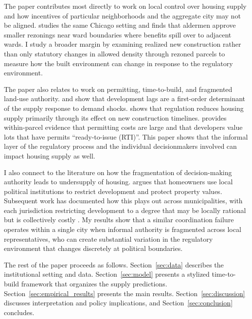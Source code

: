 The paper contributes most directly to work on local control over housing supply and how incentives of particular neighborhoods and the aggregate city may not be aligned. 
\citet{khan_decentralized_2021} studies the same Chicago setting and finds that aldermen approve smaller rezonings near ward boundaries where benefits spill over to adjacent wards.
I study a broader margin by examining realized new construction rather than only statutory changes in allowed density through rezoned parcels to measure how the built environment can change in response to the regulatory environment.

The paper also relates to work on permitting, time-to-build, and fragmented land-use authority.
\citet{mayer_land_2000} and \citet{mayer_residential_2000} show that development lags are a first-order determinant of the supply response to demand shocks.
\citet{paciorek_supply_2013} shows that regulation reduces housing supply primarily through its effect on new construction timelines.
\citet{soltas_how_2026} provides within-parcel evidence that permitting costs are large and that developers value lots that have permits ``ready-to-issue (RTI)''.
This paper shows that the informal layer of the regulatory process and the individual decisionmakers involved can impact housing supply as well.

I also connect to the literature on how the fragmentation of decision-making authority leads to undersupply of housing.
\citet{fischel_homevoter_2009} argues that homeowners use local political institutions to restrict development and protect property values.
Subsequent work has documented how this plays out across municipalities, with each jurisdiction restricting development to a degree that may be locally rational but is collectively costly \citep{hilber_origins_2013, ortalo-magne_political_2014, kulka_under_2026, monarrez_dividing_2023, mast_warding_2024, bordeu_commuting_2025}.
My results show that a similar coordination failure operates within a single city when informal authority is fragmented across local representatives, who can create substantial variation in the regulatory environment that changes discretely at political boundaries.

The rest of the paper proceeds as follows.
Section~\ref{sec:data} describes the institutional setting and data.
Section~\ref{sec:model} presents a stylized time-to-build framework that organizes the supply predictions.
Section~\ref{sec:empirical_results} presents the main results.
Section~\ref{sec:discussion} discusses interpretation and policy implications, and Section~\ref{sec:conclusion} concludes.
